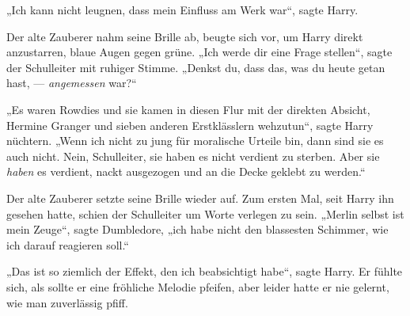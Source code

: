„Ich kann nicht leugnen, dass mein Einfluss am Werk war“, sagte Harry.

Der alte Zauberer nahm seine Brille ab, beugte sich vor, um Harry direkt anzustarren, blaue Augen gegen grüne.
„Ich werde dir eine Frage stellen“, sagte der Schulleiter mit ruhiger Stimme.
„Denkst du, dass das, was du heute getan hast, — \emph{angemessen} war?“

„Es waren Rowdies und sie kamen in diesen Flur mit der direkten Absicht, Hermine Granger und sieben anderen Erstklässlern wehzutun“, sagte Harry nüchtern.
„Wenn ich nicht zu jung für moralische Urteile bin, dann sind sie es auch nicht. Nein, Schulleiter, sie haben es nicht verdient zu sterben. Aber sie \emph{haben} es verdient, nackt ausgezogen und an die Decke geklebt zu werden.“

Der alte Zauberer setzte seine Brille wieder auf. Zum ersten Mal, seit Harry ihn gesehen hatte, schien der Schulleiter um Worte verlegen zu sein.
„Merlin selbst ist mein Zeuge“, sagte Dumbledore, „ich habe nicht den blassesten Schimmer, wie ich darauf reagieren soll.“

„Das ist so ziemlich der Effekt, den ich beabsichtigt habe“, sagte Harry. Er fühlte sich, als sollte er eine fröhliche Melodie pfeifen, aber leider hatte er nie gelernt, wie man zuverlässig pfiff.

